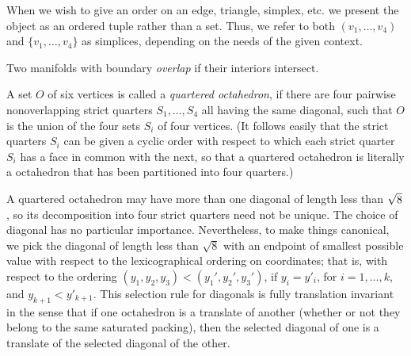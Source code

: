When we wish to give an order on an edge, triangle, simplex, etc.
we present the object as an ordered tuple rather than a set. Thus,
we refer to both $(v_1,\ldots,v_4)$ and $\{v_1,\ldots,v_4\}$ as
simplices, depending on the needs of the given context.

\begin{definition}
Two manifolds with boundary {\it overlap\/} if their interiors
intersect.
\end{definition}


\begin{definition}  A set $O$ of six vertices is
called a {\it quartered  octahedron}, if there are
four pairwise nonoverlapping strict quarters $S_1,\ldots,S_4$ all
having the same diagonal, such that $O$ is the union of the four
sets $S_i$ of four vertices.  (It follows easily that the strict
quarters $S_i$ can be given a cyclic order with respect to which
each strict quarter $S_i$ has a face in common with the next, so
that a quartered octahedron is literally a octahedron that has been
partitioned into four quarters.)
\end{definition}

\begin{remark}\label{def:oct-order}
A quartered octahedron may have more than one diagonal of length
less than $\sqrt8$, so its decomposition into four strict quarters
need not be unique.  The choice of diagonal has no particular
importance.  Nevertheless, to make things canonical, we pick the
diagonal of length less than $\sqrt8$ with an endpoint of smallest
possible value with respect to the lexicographical ordering on
coordinates; that is, with respect to the ordering $(y_1,y_2,y_3)
< (y_1',y_2',y_3')$, if $y_i=y'_i$, for $i=1,\ldots,k$, and
$y_{k+1}<y'_{k+1}$.  This selection rule for diagonals is fully
translation invariant in the sense that if one octahedron is a
translate of another (whether or not they belong to the same
saturated packing), then the selected diagonal of one is a
translate of the selected diagonal of the other.
\end{remark}



